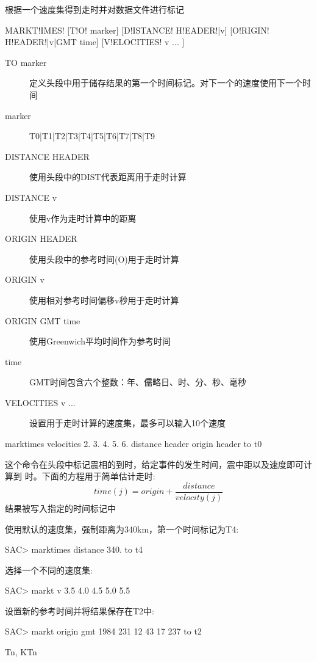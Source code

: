 \label{cmd:marktimes}

根据一个速度集得到走时并对数据文件进行标记

\begin{SACSTX}
MARKT!IMES! [T!O! marker] [D!ISTANCE! H!EADER!|v] [O!RIGIN! H!EADER!|v|GMT time] 
    [V!ELOCITIES! v ... ]
\end{SACSTX}

\begin{description}
\item [TO marker] 定义头段中用于储存结果的第一个时间标记。对下一个的速度使用下一个时间 
\item [marker]  T0|T1|T2|T3|T4|T5|T6|T7|T8|T9 
\item [DISTANCE HEADER] 使用头段中的DIST代表距离用于走时计算 
\item [DISTANCE v] 使用v作为走时计算中的距离 
\item [ORIGIN HEADER] 使用头段中的参考时间(O)用于走时计算 
\item [ORIGIN v] 使用相对参考时间偏移v秒用于走时计算 
\item [ORIGIN GMT time] 使用Greenwich平均时间作为参考时间 
\item [time] GMT时间包含六个整数：年、儒略日、时、分、秒、毫秒 
\item [VELOCITIES v ... ] 设置用于走时计算的速度集，最多可以输入10个速度 
\end{description}

\begin{SACDFT}
marktimes velocities 2. 3. 4. 5. 6.  distance header origin header to t0
\end{SACDFT}

这个命令在头段中标记震相的到时，给定事件的发生时间，震中距以及速度即可计算到	时。下面的方程用于简单估计走时:
 		\[ time(j) = origin + \frac{distance}{velocity(j)} \]
结果被写入指定的时间标记中

使用默认的速度集，强制距离为340km，第一个时间标记为T4:
\begin{SACCode}
SAC> marktimes distance 340. to t4
\end{SACCode}

选择一个不同的速度集:
\begin{SACCode}
SAC> markt v 3.5 4.0 4.5 5.0 5.5
\end{SACCode}

设置新的参考时间并将结果保存在T2中:
\begin{SACCode}
SAC> markt origin gmt 1984 231 12 43 17 237 to t2
\end{SACCode}

Tn, KTn
